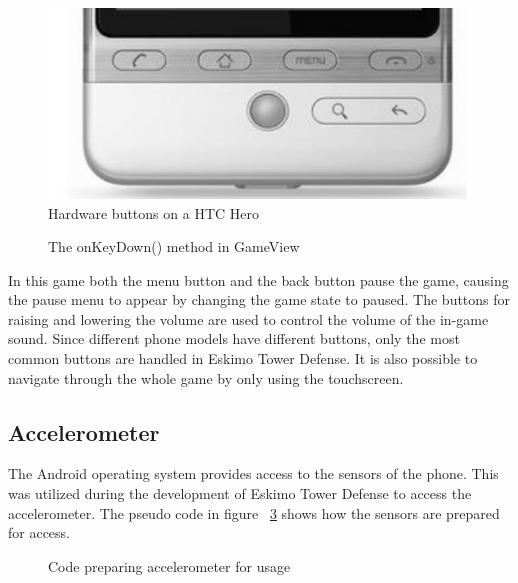 \begin{figure} [here]
\begin{center}
\includegraphics[scale=0.6]{pics/chapters/chapter4/physicalbuttons}
\end{center}
\caption{Hardware buttons on a HTC Hero}
\label{fig:htcHeroButtons}
\end{figure}

\clearpage

\begin{figure}[here]
\begin{small}

\end{small}
\caption{The onKeyDown() method in GameView}
\label{fig:codeExOnKeyDown}
\end{figure}

In this game both the menu button and the back button pause the game, causing the pause menu to appear by changing the game state to paused. The buttons for raising and lowering the volume are used to control the volume of the in-game sound. Since different phone models have different buttons, only the most common buttons are handled in Eskimo Tower Defense. It is also possible to navigate through the whole game by only using the touchscreen.

\subsection{Accelerometer}

The Android operating system provides access to the sensors of the phone. This was utilized during the development of Eskimo Tower Defense to access the accelerometer. The pseudo code in figure ~\ref{fig:codeExAccelerometerCode} shows how the sensors are prepared for access.

\begin{figure}[htb]

\begin{small}

\end{small}

\caption{Code preparing accelerometer for usage}
\label{fig:codeExAccelerometerCode}

\end{figure}

